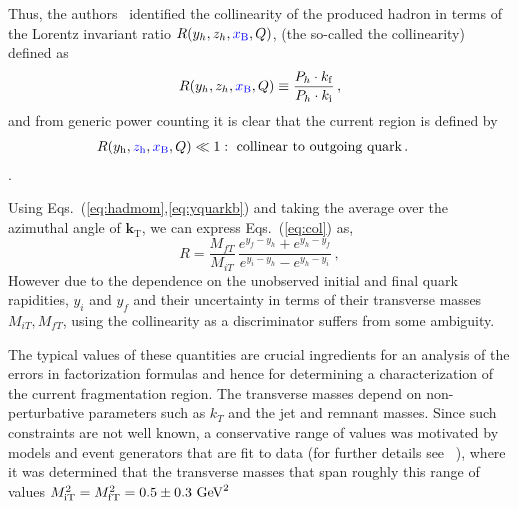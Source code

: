 \documentclass[final,3p,times,onecolumn,sort&compress,hidelinks]{elsarticle}
\newcommand{\xbj}{\ensuremath{{\cbl x_{\rm B}}}}
\newcommand{\zh}{\ensuremath{{\cbl z_{\rm h}}}}
\newcommand{\Tsc}[2]{#1_{#2\text{T}}}
\newcommand{\Tscsq}[2]{#1^2_{#2\text{T}}}
\newcommand{\initq}{\ensuremath{k_{\rm i}}}
\newcommand{\finalq}{\ensuremath{k_{\rm f}}}
\newcommand{\hady}{\ensuremath{y_{\rm h}}}
\newcommand{\inity}{\ensuremath{y_{\rm i}}}
\newcommand{\finaly}{\ensuremath{y_{\rm f}}}
\newcommand{\ratiocur}{\ensuremath{R}}
\newcommand{\T}[2]{\boldsymbol{#1}_{#2\text{T}}}
\newcommand\3[1]{\boldsymbol{#1}}
\newcommand{\cbl}{\color{blue}}
\begin{document}
{Thus, the authors~\cite{Boglione:2016bph} identified the collinearity of the produced hadron in terms of the Lorentz invariant ratio $R(y_h,z_h,\xbj,Q)$,
(the so-called the collinearity) defined as
\begin{equation}
  R(y_h,z_h,\xbj,Q)\equiv \frac{P_h\cdot \finalq}{P_h\cdot \initq}\, ,
  \label{eq:col}
\end{equation}
and from generic power counting it is clear that the current region is
defined by
\begin{align}
\ratiocur(\hady,\zh,\xbj,Q) \ll 1 &:~ \text{collinear to outgoing quark} \, .
\end{align}.


Using Eqs.~(\ref{eq:hadmom},\ref{eq:yquarkb}) and taking the average over the azimuthal angle of
$\T{k}{}$, we can express Eqs.~(\ref{eq:col}) as,
\begin{equation}
R = \frac{M_{fT}} {M_{iT}}\,\frac{e^{y_f-y_h}+e^{y_h-y_f}} {e^{y_i-y_h}-e^{y_h-y_i}}\,,
\label{eq:colrapid}
\end{equation}
However due to the  dependence on the unobserved 
initial and final quark rapidities, $y_i$ and $y_f$ and their uncertainty in terms of their transverse masses  $M_{iT},  M_{fT}$, using the collinearity as a discriminator suffers from some ambiguity.


The typical values of these quantities are crucial ingredients for an
analysis of the errors in factorization formulas and hence for
determining a characterization of the current fragmentation region.
The transverse masses depend on non-perturbative parameters such as
$k_T$ and the jet and remnant masses. Since such constraints are not well known,
a conservative range of values was motivated by models and event generators that are fit to data (for further details see ~\cite{Boglione:2016bph}), 
where it was determined that the  transverse masses that span roughly this range of values
$\Tsc{M}{\rm i}^2 = \Tsc{M}{\rm f}^2 = 0.5 \pm 0.3~{\rm GeV}^2 $
  
}
\end{document}
